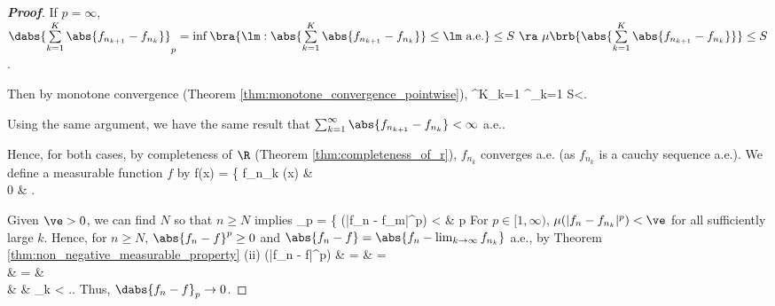 \begin{proof}[\bf Proof]
\item [(ii)] If $p=\infty$, $\dabs{\sum\limits^K_{k=1}\abs{f_{n_{k+1}} - f_{n_k}}}_p = \inf\bra{\lm : \abs{\sum\limits^K_{k=1}\abs{f_{n_{k+1}} - f_{n_k}}}\leq \lm \text{ a.e.}} \leq S \ \ra\  \mu\brb{\abs{\sum\limits^K_{k=1}\abs{f_{n_{k+1}} - f_{n_k}}}}\leq S$.

Then by monotone convergence (Theorem \ref{thm:monotone_convergence_pointwise}),
\be
\sum^K_{k=1}  \ua \sum^\infty_{k=1}  \quad\ra\quad \mu{} \ua \mu{} \leq S<\infty.
\ee

Using the same argument, we have the same result that $\sum^\infty_{k=1} \abs{f_{n_{k+1}} - f_{n_k}} < \infty$ a.e..
\een

Hence, for both cases, by completeness of $\R$ (Theorem \ref{thm:completeness_of_r}), $f_{n_k}$ converges a.e. (as $f_{n_k}$ is a cauchy sequence a.e.). We define a measurable function $f$ by
\be
f(x) = \left\{
\lim f_{n_k} (x) \quad \quad & \\
0 & 
\ea\right.
\ee

Given $\ve > 0$, we can find $N$ so that $n \geq N$ implies
\be
{}_p = \left\{
\mu(|f_n - f_m|^p) < \ve\quad\quad & p \in [1,\infty)\\
\inf\bra{\lm:\abs{f_n - f_m} \leq \lm \text{ a.e.}} < \ve\quad\quad & p =\infty
\ea\right.\quad \text{for all }m \geq n,
\ee

\ben
\item [(i)] For $p\in [1,\infty)$, $\mu(|f_n - f_{n_k}|^p) < \ve$ for all sufficiently large $k$. Hence, for $n \geq N$, $\abs{f_n-f}^p \geq 0$ and $\abs{f_n -f} = \abs{f_n - \lim_{k\to \infty} f_{n_k}}$ a.e., by Theorem \ref{thm:non_negative_measurable_property} (ii)
\beast
\mu(|f_n - f|^p) & = & \mu{} = \mu{}  \\
& = & \mu{} \quad{}\\
& \leq & \liminf_{k\to \infty} \mu{} < \ve.\quad {}.
\eeast
Thus, $\dabs{f_n - f}_p \to 0$.


\end{proof}
